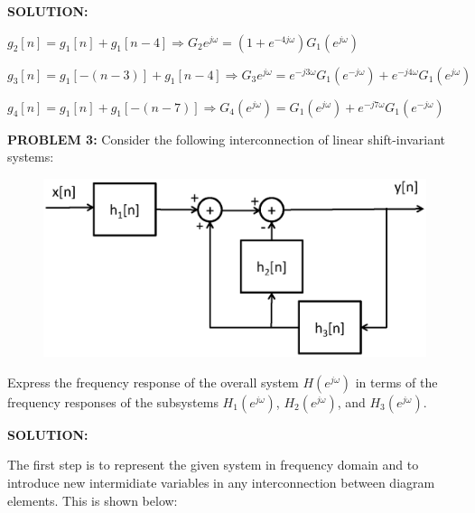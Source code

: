 \documentclass[a4paper,11pt,oneside]{article}
\begin{document}
\vspace{1cm}



\textbf{SOLUTION:}


$g_2[n]=g_1[n]+g_1[n-4]\Rightarrow G_2{e^{j\omega}}=\left(1+e^{-4j\omega}\right)G_1(e^{j\omega})$

\vspace{.5cm}

$g_3[n]=g_1[-(n-3)]+g_1[n-4]\Rightarrow G_3{e^{j\omega}}=e^{-j3\omega}G_1(e^{-j\omega})+e^{-j4\omega}G_1(e^{j\omega})$

\vspace{.5cm}

$g_4[n]=g_1[n]+g_1[-(n-7)]\Rightarrow G_4(e^{j\omega})=G_1(e^{j\omega})+e^{-j7\omega}G_1(e^{-j\omega})$

\vspace{1cm}



\textbf{PROBLEM 3:}  Consider the following interconnection of linear shift-invariant systems:

\begin{figure}[ht!]
\centering
\includegraphics[width=.7\textwidth]{fig1.eps}
\end{figure}

Express the frequency response of the overall system $H(e^{j\omega})$ in terms of the frequency responses of the subsystems $H_1(e^{j\omega})$, $H_2(e^{j\omega})$, and $H_3(e^{j\omega})$.

\vspace{1cm}
\textbf{SOLUTION:}



The first step is to represent the given system in frequency domain and to introduce new intermidiate variables in any interconnection between diagram elements. This is shown below:
\end{document}
